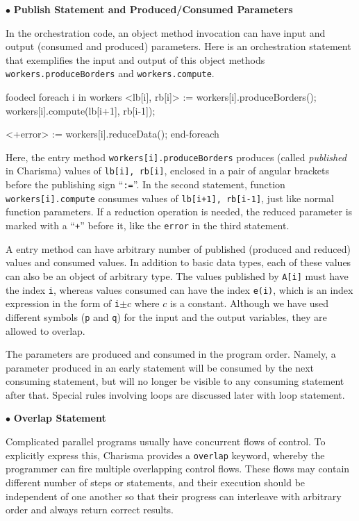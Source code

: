 \documentclass[10pt]{article}
\def\smallfbox#1{{\small {\fbox{#1}}}}
\def\code#1{{\small {\tt {#1}}}}
\begin{document}
$\bullet$ {\bf Publish Statement and Produced/Consumed Parameters}

In the orchestration code, an object method invocation can have input and output
(consumed and produced) parameters. Here is an orchestration statement that
exemplifies the input and output of this object methods
\code{workers.produceBorders} and \code{workers.compute}. 

\begin{SaveVerbatim}{foodecl}
  foreach i in workers
    <lb[i], rb[i]> := workers[i].produceBorders();
    workers[i].compute(lb[i+1], rb[i-1]);
    
    <+error> := workers[i].reduceData();
  end-foreach
\end{SaveVerbatim}
\vspace{0.1in}
\smallfbox{\BUseVerbatim{foodecl}}
\vspace{0.1in}

Here, the entry method \code{workers[i].produceBorders} produces (called {\em
published} in Charisma) values of \code{lb[i], rb[i]}, enclosed in a pair of
angular brackets before the publishing sign ``\code{:=}''. In the second
statement, function \code{workers[i].compute} consumes values of \code{lb[i+1],
rb[i-1]}, just like normal function parameters. If a reduction operation is
needed, the reduced parameter is marked with a ``\code{+}'' before it, like the
\code{error} in the third statement. 

A entry method can have arbitrary number of published (produced and reduced)
values and consumed values. In addition to basic data types, each of these
values can also be an object of arbitrary type. The values published by
\code{A[i]} must have the index \code{i}, whereas values consumed can have the
index \code{e(i)}, which is an index expression in the form of \code{i}$\pm c$
where $c$ is a constant. Although we have used different symbols (\code{p} and
\code{q}) for the input and the output variables, they are allowed to overlap. 

The parameters are produced and consumed in the program order. Namely, a
parameter produced in an early statement will be consumed by the next consuming
statement, but will no longer be visible to any consuming statement after that.
Special rules involving loops are discussed later with loop statement.

$\bullet$ {\bf Overlap Statement}

Complicated parallel programs usually have concurrent flows of control. To
explicitly express this, Charisma provides a \code{overlap} keyword, whereby the
programmer can fire multiple overlapping control flows. These flows may contain
different number of steps or statements, and their execution should be
independent of one another so that their progress can interleave with arbitrary
order and always return correct results. 
\end{document}
